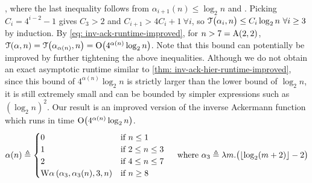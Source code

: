 , where the last inequality follows from $\alpha_{i+1}(n)\le \log_2n$ and . Picking $C_i = 4^{i-2} - 1$ gives $C_3 > 2$ and $C_{i+1} > 4C_i +1 \ \forall i$, so $\mathcal{T}\big(\alpha_i, n\big) \le C_i\log_2n \ \forall i\ge 3$ by induction. By \eqref{eq: inv-ack-runtime-improved}, for $n > 7 = \text{A}(2, 2)$, $\mathcal{T}(\alpha, n) = \mathcal{T}\big(\alpha_{\alpha(n)}, n\big) = \text{O}\big(4^{\alpha(n)}\log_2n\big)$. Note that this bound can potentially be improved by further tightening the above inequalities. Although we do not obtain an exact asymptotic runtime similar to \cref{thm: inv-ack-hier-runtime-improved}, since this bound of $4^{\alpha(n)}\log_2n$ is strictly larger than the lower bound of $\log_2n$, it is still extremely small and can be bounded by simpler expressions such as $(\log_2n)^2$. Our result is an improved version of the inverse Ackermann function which runs in time $\text{O}\big(4^{\alpha(n)}\log_2n\big)$.
\begin{equation*}
\alpha(n) \triangleq \begin{cases}
0 & \text{if } n\le 1\\ 1 & \text{if } 2\le n\le 3 \\ 2 & \text{if } 4\le n\le 7 \\
\text{W}\alpha\left(\alpha_3,
\alpha_3(n), 3, n\right) & \text{if } n\ge 8
\end{cases} \quad \text{ where } \alpha_3 \triangleq \lambda m. \big(\lfloor \log_2(m+2) \rfloor - 2\big)
\end{equation*}
